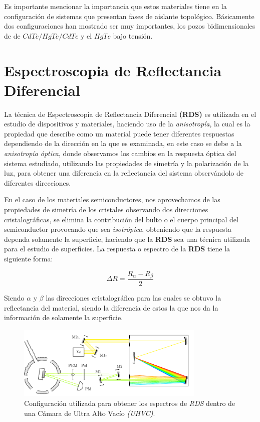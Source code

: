 Es importante mencionar la importancia que estos materiales tiene en la configuración de sistemas que presentan fases de aislante topológico. Básicamente dos configuraciones han mostrado ser muy importantes, los pozos bidimensionales de de $ CdTe/HgTe/CdTe $ y el $ HgTe $ bajo tensión.

\section{Espectroscopia de Reflectancia Diferencial}
\label{sec:chap3-rds}
La técnica de Espectroscopia de Reflectancia Diferencial \textbf{(RDS)} es utilizada en el estudio de dispositivos y materiales, haciendo uso de la \textit{anisotropía}, la cual es la propiedad que describe como un material puede tener diferentes respuestas dependiendo de la dirección en la que es examinada, en este caso se debe a la \textit{anisotropía óptica}, donde observamos los cambios en la respuesta óptica del sistema estudiado, utilizando las propiedades de simetría y la polarización de la luz, para obtener una diferencia en la reflectancia del sistema observándolo de diferentes direcciones.

En el caso de los materiales semiconductores, nos aprovechamos de las propiedades de simetría de los cristales observando dos direcciones cristalográficas, se elimina la contribución del bulto o el cuerpo principal del semiconductor provocando que sea \textit{isotrópica}, obteniendo que la respuesta dependa solamente la superficie, haciendo que la \textbf{RDS} sea una técnica utilizada para el estudio de superficies.\cite{Aspnes1985} La respuesta o espectro de la \textbf{RDS} tiene la siguiente forma:

\begin{equation}
    \label{eqn:ch3-rds-eqn}
    {\Delta R} = \dfrac{R_{\alpha}-R_{\beta}}{2}
\end{equation}

Siendo $ \alpha $ y $ \beta $ las direcciones cristalográfica para las cuales se obtuvo la reflectancia del material, siendo la diferencia de estos la que nos da la información de solamente la superficie.

\begin{figure}[h!]
    \centering
    \includegraphics[width=0.8\textwidth]{figures/chap3/RAS-SETUP-gaby.pdf}
        \caption{Configuración utilizada para obtener los espectros de \textit{RDS} dentro de una Cámara de Ultra Alto Vacío \textit{(UHVC)}.\cite{PdHGaby}}
    \label{fig:rds-setup}
\end{figure}

